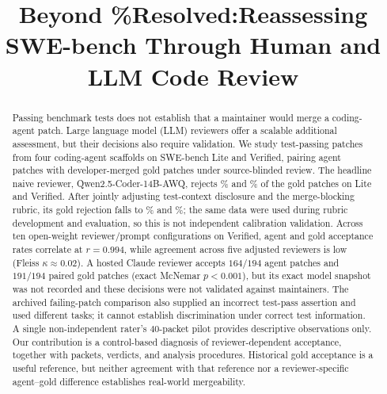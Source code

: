 \documentclass[10pt,conference]{IEEEtran}
\begin{document}
\title{Beyond \%Resolved:Reassessing SWE-bench Through Human and LLM Code Review}


\author{
}

\maketitle


\begin{abstract}
Passing benchmark tests does not establish that a maintainer would merge a coding-agent
patch. Large language model (LLM) reviewers offer a scalable additional assessment, but their
decisions also require validation. We study test-passing patches from four coding-agent
scaffolds on SWE-bench Lite and Verified, pairing agent patches with developer-merged gold
patches under source-blinded review. The headline naive reviewer, Qwen2.5-Coder-14B-AWQ,
rejects \strictFalseRejLite\% and \strictFalseRejVerified\% of the gold patches on Lite and
Verified. After jointly adjusting test-context disclosure and the merge-blocking rubric,
its gold rejection falls to \calFalseRejLite\% and \calFalseRejVerified\%; the same data were
used during rubric development and evaluation, so this is not independent calibration
validation. Across ten open-weight reviewer/prompt configurations on Verified, agent and
gold acceptance rates correlate at $r=0.994$, while agreement across five adjusted
reviewers is low (Fleiss $\kappa\approx0.02$). A hosted Claude reviewer accepts $164/194$
agent patches and $191/194$ paired gold patches (exact McNemar $p<0.001$), but its exact
model snapshot was not recorded and these decisions were not validated against maintainers.
The archived failing-patch comparison also supplied an incorrect test-pass assertion and
used different tasks; it cannot establish discrimination under correct test information.
A single non-independent rater's $40$-packet pilot provides descriptive observations only.
Our contribution is a control-based diagnosis of reviewer-dependent acceptance, together
with packets, verdicts, and analysis procedures. Historical gold acceptance is a useful
reference, but neither agreement with that reference nor a reviewer-specific agent--gold
difference establishes real-world mergeability.
\end{abstract}
\end{document}
